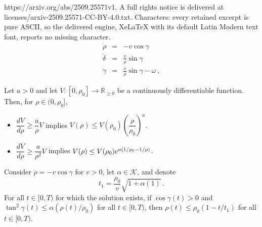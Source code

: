 \documentclass[10pt,a4paper]{amsart}
\begin{document}
https://arxiv.org/abs/2509.25571v1. A full rights notice is delivered at licenses/arxiv-2509.25571-CC-BY-4.0.txt. Characters: every retained excerpt is pure ASCII, so the delivered engine, XeLaTeX with its default Latin Modern text font, reports no missing character.
\begin{subequations}
\label{eq:unicycle_polar}
\begin{eqnarray}
\label{eq:unicycle_polar-rho}
\dot{\rho} &=& 
-v \cos\gamma\\
\label{eq:unicycle_polar-delta}
\dot{\delta} &=&  \frac{v}{\rho} \sin\gamma
\\
\label{eq:unicycle_polar-gamma}
\dot{\gamma} &=&  \frac{v}{\rho} \sin\gamma -\omega  \,,
\end{eqnarray} 
\end{subequations}

\begin{lemma}
\label{lem1}
Let $a>0$ and let $V:[0,\rho_0]\to\mathbb{R}_{\ge 0}$ be a continuously differentiable function. Then, for $\rho\in(0,\rho_0]$,
\begin{itemize}
\item $\dfrac{dV}{d\rho} \geq \dfrac{a}{\rho}V$ implies $V(\rho)\leq V(\rho_0) \left(\dfrac{\rho}{\rho_0}\right)^a$. 
\item $\dfrac{dV}{d\rho} \geq \dfrac{a}{\rho^2}V$ implies $V(\rho)\leq V(\rho_0) {\rm e}^{a\left(1/{\rho_0}-{1}/{\rho}\right)}$. 
\end{itemize}
\end{lemma}

\begin{lemma}
\label{lem2}
Consider $\dot\rho = - v\cos\gamma$ for $v>0$, let $\alpha\in\mathcal{K}$, and denote
\begin{equation}
t_1 = \frac{\rho_0}{v}\sqrt{1+\alpha(1)}\,.
\end{equation}
For all $t\in [0,T)$  for which the solution exists, if $\cos\gamma(t)>0$ and $\tan^2\gamma(t)\leq \alpha(\rho(t)/\rho_0)$ for all $t\in[0,T)$, then $\rho(t)\leq \rho_0(1-t/t_1)$ for all $t\in[0,T)$.
\end{lemma}
\end{document}
